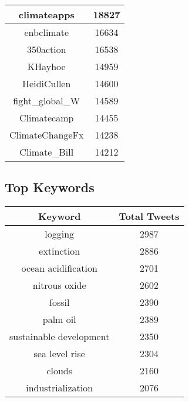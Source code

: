 \documentclass{article}\usepackage[T1]{fontenc}
\begin{document}
\begin{tabular}{|c|c|}
 \hline
climateapps & 18827\\ 
 \hline
enbclimate & 16634\\ 
 \hline
350action & 16538\\ 
 \hline
KHayhoe & 14959\\ 
 \hline
HeidiCullen & 14600\\ 
 \hline
fight\_global\_W & 14589\\ 
 \hline
Climatecamp & 14455\\ 
 \hline
ClimateChangeFx & 14238\\ 
 \hline
Climate\_Bill & 14212\\ 
 \hline
\end{tabular}\subsection*{Top Keywords}\begin{tabular}{|c|c|}         \hline         Keyword & Total Tweets \\ 
 \hline
logging & 2987\\ 
 \hline
extinction & 2886\\ 
 \hline
ocean acidification & 2701\\ 
 \hline
nitrous oxide & 2602\\ 
 \hline
fossil & 2390\\ 
 \hline
palm oil & 2389\\ 
 \hline
sustainable development & 2350\\ 
 \hline
sea level rise & 2304\\ 
 \hline
clouds & 2160\\ 
 \hline
industrialization & 2076\\ 
 \hline
\end{tabular}
\end{document}
